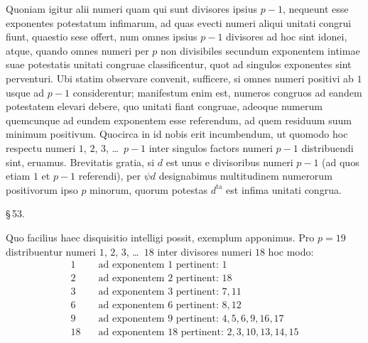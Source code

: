 \documentclass[12pt,a4paper]{article}
\theoremstyle{plain}
\theoremstyle{definition}
\theoremstyle{remark}
\begin{document}
Quoniam igitur alii numeri quam qui sunt divisores ipsius $p-1$, nequeunt esse exponentes potestatum infimarum, ad quas evecti numeri aliqui unitati congrui fiunt, quaestio sese offert, num omnes ipsius $p-1$ divisores ad hoc sint idonei, atque, quando omnes numeri per $p$ non divisibiles secundum exponentem intimae suae potestatis unitati congruae classificentur, quot ad singulos exponentes sint perventuri. Ubi statim observare convenit, sufficere, si omnes numeri positivi ab $1$ usque ad $p-1$ considerentur; manifestum enim est, numeros congruos ad eandem potestatem elevari debere, quo unitati fiant congruae, adeoque numerum quemcunque ad eundem exponentem esse referendum, ad quem residuum suum minimum positivum. Quocirca in id nobis erit incumbendum, ut quomodo hoc respectu numeri $1$, $2$, $3$, \dots\ $p-1$ inter singulos factors numeri $p-1$ distribuendi sint, eruamus. Brevitatis gratia, si $d$ est unus e divisoribus numeri $p-1$ (ad quos etiam $1$ et $p-1$ referendi), per $\psi d$ designabimus multitudinem numerorum positivorum ipso $p$ minorum, quorum potestas $d^\text{ta}$ est infima unitati congrua.

\begin{center}\S\,53.\end{center}

Quo facilius haec disquisitio intelligi possit, exemplum apponimus. Pro $p = 19$ distribuentur numeri $1$, $2$, $3$, \dots\ $18$ inter divisores numeri $18$ hoc modo:
\begin{align*}
1 &\quad \text{ad exponentem } 1 \text{ pertinent: } 1 \\
2 &\quad \text{ad exponentem } 2 \text{ pertinent: } 18 \\
3 &\quad \text{ad exponentem } 3 \text{ pertinent: } 7, 11 \\
6 &\quad \text{ad exponentem } 6 \text{ pertinent: } 8, 12 \\
9 &\quad \text{ad exponentem } 9 \text{ pertinent: } 4, 5, 6, 9, 16, 17 \\
18 &\quad \text{ad exponentem } 18 \text{ pertinent: } 2, 3, 10, 13, 14, 15
\end{align*}
\end{document}
